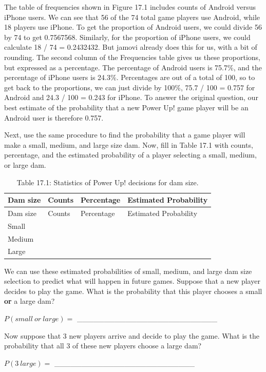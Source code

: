 \documentclass[
  openany]{scrbook}
\begin{document}
The table of frequencies shown in Figure 17.1 includes counts of Android versus iPhone users.
We can see that 56 of the 74 total game players use Android, while 18 players use iPhone.
To get the proportion of Android users, we could divide 56 by 74 to get 0.7567568.
Similarly, for the proportion of iPhone users, we could calculate 18 / 74 = 0.2432432.
But jamovi already does this for us, with a bit of rounding.
The second column of the Frequencies table gives us these proportions, but expressed as a percentage.
The percentage of Android users is 75.7\%, and the percentage of iPhone users is 24.3\%.
Percentages are out of a total of 100, so to get back to the proportions, we can just divide by 100\%, 75.7 / 100 = 0.757 for Android and 24.3 / 100 = 0.243 for iPhone.
To answer the original question, our best estimate of the probability that a new Power Up! game player will be an Android user is therefore 0.757.

Next, use the same procedure to find the probability that a game player will make a small, medium, and large size dam.
Now, fill in Table 17.1 with counts, percentage, and the estimated probability of a player selecting a small, medium, or large dam.

\begin{longtable}[]{@{}llll@{}}
\caption{Table 17.1: Statistics of Power Up! decisions for dam size.}\tabularnewline
\toprule
Dam size & Counts & Percentage & Estimated Probability \\
\midrule
\endfirsthead
\toprule
Dam size & Counts & Percentage & Estimated Probability \\
\midrule
\endhead
Small & & & \\
Medium & & & \\
Large & & & \\
\bottomrule
\end{longtable}

We can use these estimated probabilities of small, medium, and large dam size selection to predict what will happen in future games.
Suppose that a new player decides to play the game.
What is the probability that this player chooses a small \textbf{or} a large dam?

\(P(small\:or\:large) =\) \_\_\_\_\_\_\_\_\_\_\_\_\_\_\_\_\_\_\_\_\_\_\_\_\_\_

Now suppose that 3 new players arrive and decide to play the game.
What is the probability that all 3 of these new players choose a large dam?

\(P(3\:large) =\) \_\_\_\_\_\_\_\_\_\_\_\_\_\_\_\_\_\_\_\_\_\_\_\_\_\_
\end{document}
